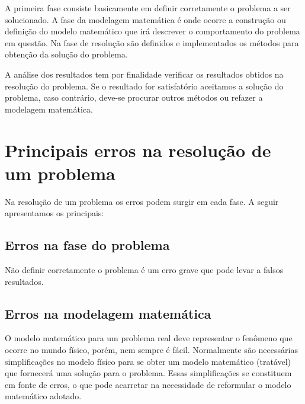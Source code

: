 \documentclass[
	12pt,				%
	openright,			%
	twoside,			%
	a4paper,			%
	english,			%
	french,				%
	brazil,				%
	sumario=tradicional
]{abntex2}
\numberwithin{example}{chapter}
\numberwithin{remark}{chapter}
\numberwithin{definition}{chapter}
\numberwithin{figure}{chapter}
\begin{document}
A primeira fase consiste basicamente em definir corretamente o problema a ser solucionado. A fase da modelagem matemática é onde ocorre a construção ou definição do modelo matemático que irá descrever o comportamento do problema em questão. Na fase de resolução são definidos e implementados os métodos para obtenção da solução do problema.

A análise dos resultados tem por finalidade verificar os resultados obtidos na resolução do problema. Se o resultado for satisfatório aceitamos a solução do problema, caso contrário, deve-se procurar outros métodos ou refazer a modelagem matemática.

\section{Principais erros na resolução de um problema}

Na resolução de um problema os erros podem surgir em cada fase. A seguir apresentamos os principais:

\subsection{Erros na fase do problema}

Não definir corretamente o problema é um erro grave que pode levar a falsos resultados.

\subsection{Erros na modelagem matemática}

O modelo matemático para um problema real deve representar o fenômeno que ocorre no mundo físico, porém, nem sempre é fácil. Normalmente são necessárias simplificações no modelo físico para se obter um modelo matemático (tratável) que fornecerá uma solução para o problema. Essas simplificações se constituem em fonte de erros, o que pode acarretar na necessidade de reformular o modelo matemático adotado.
\end{document}
